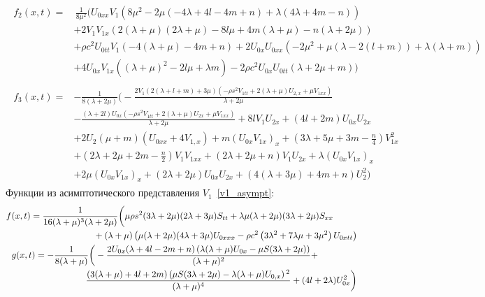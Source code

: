\documentclass[12pt, a4paper]{report}
\newcommand{\lb}{\left (}
\newcommand{\rb}{\right )}
\begin{document}
\begin{align}
\nonumber
\begin{split}
f_2(x, t) =& \, \frac{1}{8 \mu ^2} \bigg(U_{0xx} V_1 \left(8\mu^2 - 2\mu(-4\lambda + 4l - 4m + n) + \lambda(4\lambda + 4m - n)\right) \\
&+ 2V_1 V_{1x} (2 (\lambda + \mu) (2\lambda + \mu) - 8l\mu + 4m(\lambda + \mu) - n(\lambda + 2\mu)) \\
&+ \rho c^2 U_{0tt}V_1 (-4(\lambda + \mu) - 4m + n) + 2U_{0x}U_{0xx} \left(-2\mu^2 + \mu(\lambda - 2(l + m)) + \lambda (\lambda + m)\right) \\
&+ 4 U_{0x} V_{1x} \left((\lambda + \mu)^2 - 2l\mu + \lambda m\right) - 2\rho c^2 U_{0x}U_{0tt} (\lambda + 2\mu + m)\bigg)
\end{split}\\
\nonumber
\begin{split}
f_3(x, t) =& -\frac{1}{8 (\lambda +2 \mu )}\bigg(-\frac{2 V_1 (2 (\lambda +l+m)+3 \mu ) \left(-\rho  s^2 V_{1tt}+2 (\lambda +\mu ) U_{2,x}+\mu  V_{1xx}\right)}{\lambda +2 \mu }\\
&-\frac{(\lambda +2 l) U_{0x} \left(-\rho  s^2 V_{1tt}+2 (\lambda +\mu ) U_{2x}+\mu  V_{1xx}\right)}{\lambda +2 \mu }+8 l V_1 U_{2x} + (4l + 2m)U_{0x} U_{2x}\\
&+2 U_2 (\mu +m) \left(U_{0xx}+4 V_{1,x}\right)+m (U_{0x}V_{1x})_x + \lb 3\lambda + 5\mu + 3m -\frac{n}{4}\rb V_{1x}^2\\
&+\lb 2\lambda + 2\mu + 2m-\frac{n}{2}\rb V_1 V_{1xx}+(2\lambda + 2\mu + n) V_1 U_{2x} + \lambda(U_{0x}V_{1x})_x\\
&+ 2\mu(U_{0x} V_{1x})_x + (2\lambda + 2\mu)U_{0x}U_{2x} + (4 (\lambda +3 \mu )+4 m+n) U_2^2 \bigg)
\end{split}
\end{align}
Функции из асимптотического представления $V_1$~\eqref{v1_asympt}:
\begin{align}
\nonumber
\begin{split}
f(x,t) &= \frac{1}{16 (\lambda +\mu )^3 (\lambda +2 \mu )}\bigg(\mu  \rho  s^2 (3 \lambda +2 \mu ) (2 \lambda +3 \mu ) S_{tt}+\lambda  \mu  (\lambda +2 \mu ) (3 \lambda +2 \mu ) S_{xx}\\
&\hspace{25mm}+(\lambda +\mu ) \left(\mu  (\lambda +2 \mu ) (4 \lambda +3 \mu ) U_{0xxx}-\rho c^2 \left(3 \lambda ^2+7 \lambda  \mu +3 \mu ^2\right) U_{0xtt}\right)
\end{split}\\
\nonumber
\begin{split}
g(x,t) &= -\frac{1}{8(\lambda + \mu)}\bigg(-\frac{2U_{0x}(\lambda + 4l - 2m + n) \left(\lambda(\lambda + \mu) U_{0x} - \mu S (3\lambda + 2\mu)\right)}{(\lambda + \mu)^2} + \\
&\hspace{20mm}\frac{(3 (\lambda +\mu )+4 l+2 m) \left(\mu  S (3 \lambda +2 \mu )-\lambda  (\lambda +\mu ) U_{0,x}\right){}^2}{(\lambda +\mu )^4} + (4l + 2\lambda)  U_{0x}^2\bigg)
\end{split}
\end{align}
\end{document}

